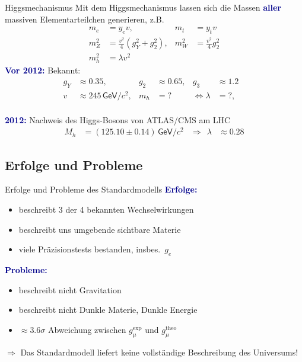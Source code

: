 \documentclass[hyperref={pdfpagelabels=false},ngerman]{beamer}
\newcommand{\eh}[1]{\,\mathsf{#1}}
\renewcommand{\emph}[1]{\textbf{\textcolor{darkblue}{#1}}}
\newcommand{\GeV}{\eh{GeV}}
\begin{document}
\begin{frame}{Higgsmechanismus}
  Mit dem Higgsmechanismus lassen sich die Massen \emph{aller}
  massiven Elementarteilchen generieren, z.B.
  \begin{align*}
    m_e &= y_e v, & m_t &= y_t v \\
    m_Z^2 &= \frac{v^2}{4}(g_Y^2 + g_2^2) , &  m_W^2 &= \frac{v^2}{4} g_2^2 \\
    m_h^2 &= \lambda v^2
  \end{align*}
  \emph{Vor 2012:}
  Bekannt:
  \begin{align*}
    g_Y &\approx 0.35, &
    g_2 &\approx 0.65, &
    g_3 &\approx 1.2 \\
    v &\approx 245\GeV/c^2, &
    m_h &={} ? &
    \Leftrightarrow \lambda &={} ?, &
  \end{align*}
  \\[1em]
  \emph{2012:} Nachweis des Higgs-Bosons von ATLAS/CMS am LHC
  \begin{align*}
    M_h &= (125.10\pm 0.14) \GeV/c^2 &
    \Rightarrow \ \ \lambda &\approx 0.28
  \end{align*}
\end{frame}

\subsection{Erfolge und Probleme}

\begin{frame}{Erfolge und Probleme des Standardmodells}
  \emph{Erfolge:}
  \begin{itemize}
  \item beschreibt 3 der 4 bekannten Wechselwirkungen
  \item beschreibt uns umgebende sichtbare Materie
  \item viele Präzisionstests bestanden, insbes.\ $g_e$
  \end{itemize}
  \vspace*{1em}
  \emph{Probleme:}
  \begin{itemize}
  \item beschreibt nicht Gravitation
  \item beschreibt nicht Dunkle Materie, Dunkle Energie
  \item $\approx 3.6\sigma$ Abweichung zwischen $g_\mu^\text{exp}$ und $g_\mu^\text{theo}$
  \end{itemize}
  \vspace*{1em}
  $\Rightarrow$ Das Standardmodell liefert keine vollständige Beschreibung
  des Universums!
\end{frame}
\end{document}
